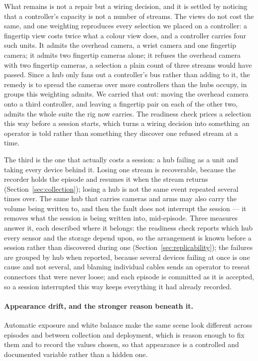 What remains is not a repair but a wiring decision, and it is settled by
noticing that a controller's capacity is not a number of streams. The views do
not cost the same, and one weighting reproduces every selection we placed on a
controller: a fingertip view costs twice what a colour view does, and a
controller carries four such units. It admits the overhead camera, a wrist camera
and one fingertip camera; it admits two fingertip cameras alone; it refuses the
overhead camera with two fingertip cameras, a selection a plain count of three
streams would have passed. Since a hub only fans out a controller's bus rather
than adding to it, the remedy is to spread the cameras over more controllers than
the hubs occupy, in groups this weighting admits. We carried that out: moving the
overhead camera onto a third controller, and leaving a fingertip pair on each of
the other two, admits the whole suite the rig now carries. The readiness check
prices a selection this way before a session starts, which turns a wiring
decision into something an operator is told rather than something they discover
one refused stream at a time.

The third is the one that actually costs a session: a hub failing as a unit and
taking every device behind it. Losing one stream is recoverable, because the
recorder holds the episode and resumes it when the stream returns
(Section~\ref{sec:collection}); losing a hub is not the same event repeated
several times over. The same hub that carries cameras and arms may also carry the
volume being written to, and then the fault does not interrupt the session --- it
removes what the session is being written into, mid-episode. Three measures
answer it, each described where it belongs: the readiness check reports which hub
every sensor and the storage depend upon, so the arrangement is known before a
session rather than discovered during one (Section~\ref{sec:replicability}); the
failures are grouped by hub when reported, because several devices failing at
once is one cause and not several, and blaming individual cables sends an
operator to reseat connectors that were never loose; and each episode is
committed as it is accepted, so a session interrupted this way keeps everything
it had already recorded.

\paragraph{Appearance drift, and the stronger reason beneath it.} Automatic
exposure and white balance make the same scene look different across episodes and
between collection and deployment, which is reason enough to fix them and to
record the values chosen, so that appearance is a controlled and documented
variable rather than a hidden one.

